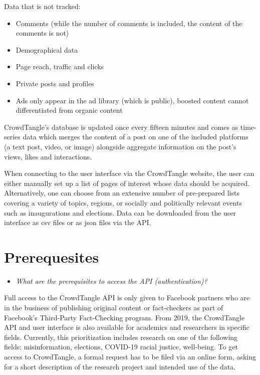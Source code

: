 \documentclass[
]{book}
\providecommand{\tightlist}{%
  \setlength{\itemsep}{0pt}\setlength{\parskip}{0pt}}
\begin{document}
Data that is not tracked:

\begin{itemize}
\tightlist
\item
  Comments (while the number of comments is included, the content of the comments is not)
\item
  Demographical data
\item
  Page reach, traffic and clicks
\item
  Private posts and profiles
\item
  Ads only appear in the ad library (which is public), boosted content cannot differentiated from organic content
\end{itemize}

CrowdTangle's database is updated once every fifteen minutes and comes as time-series data which merges the content of a post on one of the included platforms (a text post, video, or image) alongside aggregate information on the post's views, likes and interactions.

When connecting to the user interface via the CrowdTangle website, the user can either manually set up a list of pages of interest whose data should be acquired. Alternatively, one can choose from an extensive number of pre-prepared lists covering a variety of topics, regions, or socially and politically relevant events such as inaugurations and elections. Data can be downloaded from the user interface as csv files or as json files via the API.

\hypertarget{prerequesites-2}{%
\section{Prerequesites}\label{prerequesites-2}}

\begin{itemize}
\tightlist
\item
  \emph{What are the prerequisites to access the API (authentication)? }
\end{itemize}

Full access to the CrowdTangle API is only given to Facebook partners who are in the business of publishing original content or fact-checkers as part of Facebook's Third-Party Fact-Checking program.
From 2019, the CrowdTangle API and user interface is also available for academics and researchers in specific fields. Currently, this prioritization includes research on one of the following fields: misinformation, elections, COVID-19 racial justice, well-being. To get access to CrowdTangle, a formal request has to be filed via an online form, asking for a short description of the research project and intended use of the data.
\end{document}
